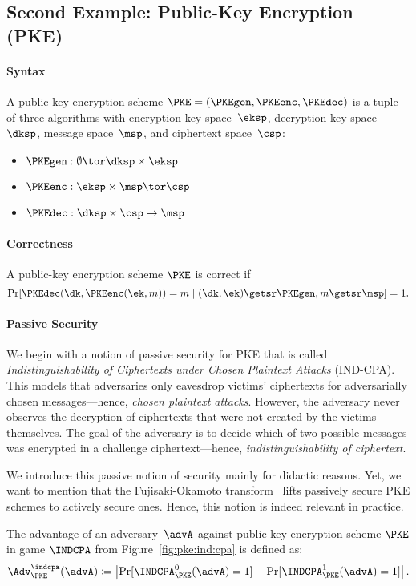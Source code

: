 \documentclass[a4paper,orivec]{llncs}
\begin{document}
\subsection{Second Example: Public-Key Encryption (PKE)}

\paragraph{Syntax}
A public-key encryption scheme $\PKE=(\PKEgen,\PKEenc,\PKEdec)$ is a tuple of three algorithms with encryption key space~$\eksp$, decryption key space~$\dksp$, message space~$\msp$, and ciphertext space~$\csp$:

\begin{itemize}
    \item $\PKEgen: \emptyset \tor \dksp\times\eksp$
    \item $\PKEenc: \eksp\times\msp \tor \csp$
    \item $\PKEdec: \dksp\times\csp \to \msp$
\end{itemize}

\paragraph{Correctness}
A public-key encryption scheme $\PKE$ is correct if
\[
\Pr[\PKEdec(\dk,\PKEenc(\ek,m))=m\mid (\dk,\ek)\getsr\PKEgen,m\getsr\msp]=1\text{.}
\]

\paragraph{Passive Security}
We begin with a notion of passive security for PKE that is called \emph{Indistinguishability of Ciphertexts under Chosen Plaintext Attacks} (IND-CPA).
This models that adversaries only eavesdrop victims' ciphertexts for adversarially chosen messages---hence, \emph{chosen plaintext attacks}.
However, the adversary never observes the decryption of ciphertexts that were not created by the victims themselves.
The goal of the adversary is to decide which of two possible messages was encrypted in a challenge ciphertext---hence, \emph{indistinguishability of ciphertext}.

We introduce this passive notion of security mainly for didactic reasons.
Yet, we want to mention that the Fujisaki-Okamoto transform~\cite{C:FujOka99} lifts passively secure PKE schemes to actively secure ones.
Hence, this notion is indeed relevant in practice.

The advantage of an adversary~$\advA$ against public-key encryption scheme $\PKE$ in game $\INDCPA$ from Figure~\ref{fig:pke:ind:cpa} is defined as:
\[
\Adv_\PKE^\indcpa(\advA)\coloneqq\left|\Pr[\INDCPA_{\PKE}^0(\advA)=1]-\Pr[\INDCPA_{\PKE}^1(\advA)=1]\right|\text{.}
\]
\end{document}
